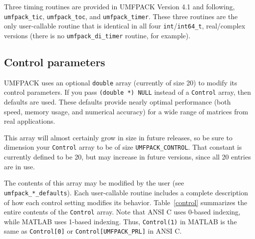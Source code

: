 \documentclass[11pt]{article}
\begin{document}
Three timing routines are provided in UMFPACK Version 4.1 and following,
{\tt umfpack\_tic}, {\tt umfpack\_toc}, and {\tt umfpack\_timer}.
These three routines are the only user-callable
routine that is identical in all four {\tt int}/\verb'int64_t', real/complex
versions (there is no {\tt umfpack\_di\_timer} routine, for example).

\subsection{Control parameters}
\label{control_param}

UMFPACK uses an optional {\tt double} array (currently of size 20)
to modify its control parameters.  If you pass {\tt (double *) NULL} instead
of a {\tt Control} array, then defaults are used.  These defaults provide
nearly optimal performance (both speed, memory usage, and numerical accuracy)
for a wide range of matrices from real applications.

This array will almost certainly grow in size in future releases,
so be sure to dimension your {\tt Control} array to be of size
{\tt UMFPACK\_CONTROL}.  That constant is currently defined to be 20,
but may increase in future versions, since all 20 entries are in use.

The contents of this array may be modified by the user
(see {\tt umfpack\_*\_defaults}).  Each
user-callable routine includes a complete description of how each control
setting modifies its behavior.  Table~\ref{control} summarizes the entire
contents of the {\tt Control} array.
Note that ANSI C uses 0-based indexing, while MATLAB uses 1-based
indexing.  Thus, {\tt Control(1)} in MATLAB is the same as
{\tt Control[0]} or {\tt Control[UMFPACK\_PRL]} in ANSI C.
\end{document}
